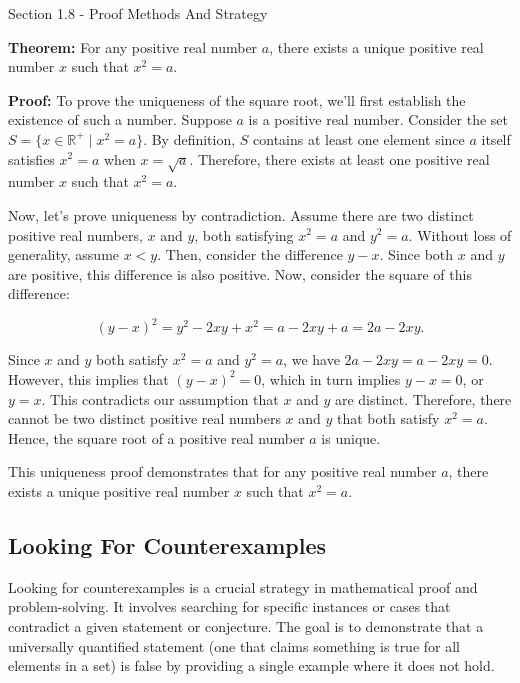 \begin{notes}{Section 1.8 - Proof Methods And Strategy}
    \begin{highlight}
        \textbf{Theorem:} For any positive real number \(a\), there exists a unique positive real number \(x\) such that \(x^2 = a\).
    
    
        \textbf{Proof:} To prove the uniqueness of the square root, we'll first establish the existence of such a number. Suppose \(a\) is a positive real number. Consider the set \(S = \{x \in \mathbb{R}^+ \mid x^2 = a\}\). 
        By definition, \(S\) contains at least one element since \(a\) itself satisfies \(x^2 = a\) when \(x = \sqrt{a}\). Therefore, there exists at least one positive real number \(x\) such that \(x^2 = a\).
    
        Now, let's prove uniqueness by contradiction. Assume there are two distinct positive real numbers, \(x\) and \(y\), both satisfying \(x^2 = a\) and \(y^2 = a\). Without loss of generality, assume \(x < y\). Then, consider 
        the difference \(y - x\). Since both \(x\) and \(y\) are positive, this difference is also positive. Now, consider the square of this difference:
        
        \[(y - x)^2 = y^2 - 2xy + x^2 = a - 2xy + a = 2a - 2xy.\]
    
        Since \(x\) and \(y\) both satisfy \(x^2 = a\) and \(y^2 = a\), we have \(2a - 2xy = a - 2xy = 0\). However, this implies that \((y - x)^2 = 0\), which in turn implies \(y - x = 0\), or \(y = x\). This contradicts our 
        assumption that \(x\) and \(y\) are distinct. Therefore, there cannot be two distinct positive real numbers \(x\) and \(y\) that both satisfy \(x^2 = a\). Hence, the square root of a positive real number \(a\) is unique.
    
        
        This uniqueness proof demonstrates that for any positive real number \(a\), there exists a unique positive real number \(x\) such that \(x^2 = a\).
    \end{highlight}
    
    \subsection*{Looking For Counterexamples}

    Looking for counterexamples is a crucial strategy in mathematical proof and problem-solving. It involves searching for specific instances or cases that contradict a given statement or conjecture. The goal is to demonstrate 
    that a universally quantified statement (one that claims something is true for all elements in a set) is false by providing a single example where it does not hold.


\end{notes}
